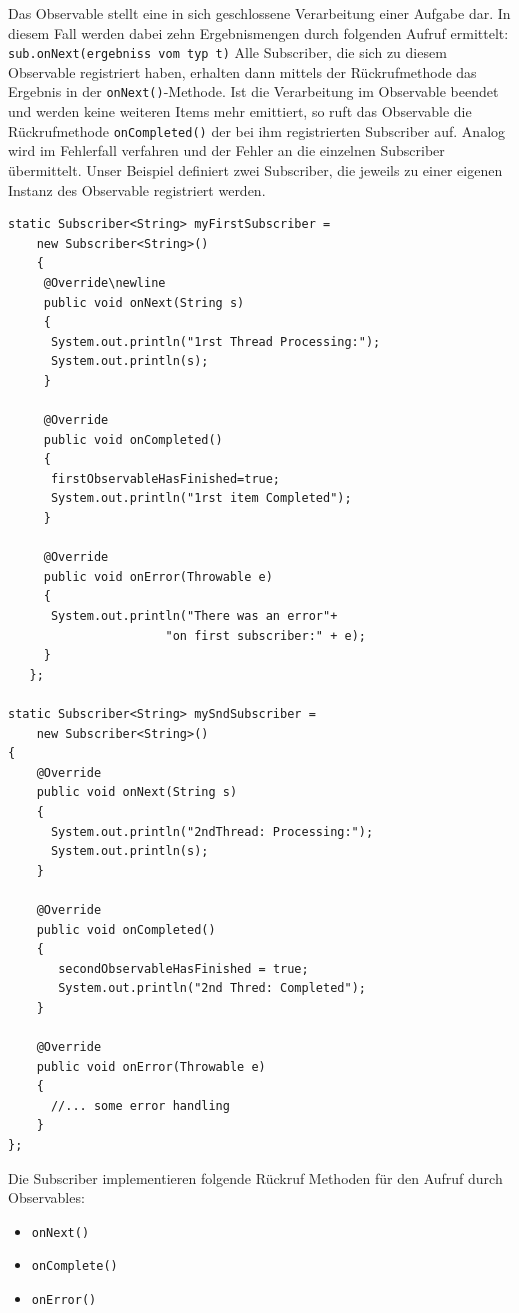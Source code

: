 \documentclass[12pt,oneside,a4paper,bibtotoc,liststotoc]{scrreprt}
\begin{document}
Das Observable stellt eine in sich geschlossene Verarbeitung einer Aufgabe dar. In diesem Fall werden dabei zehn Ergebnismengen durch folgenden Aufruf ermittelt:\newline\newline
\texttt{sub.onNext(ergebniss vom typ t)}\newline
\newline
Alle Subscriber, die sich zu diesem Observable registriert haben, erhalten dann mittels der Rückrufmethode das Ergebnis in der \texttt{onNext()}-Methode. Ist die Verarbeitung im Observable beendet und werden keine weiteren Items mehr emittiert, so ruft das Observable die Rückrufmethode \texttt{onCompleted()} der bei ihm registrierten Subscriber auf. Analog wird im Fehlerfall verfahren und der Fehler an die einzelnen Subscriber übermittelt. Unser Beispiel definiert zwei Subscriber, die jeweils zu einer eigenen Instanz des Observable registriert werden.\newline
\begin{lstlisting}
static Subscriber<String> myFirstSubscriber = 
    new Subscriber<String>() 
    {
     @Override\newline
     public void onNext(String s) 
     {
      System.out.println("1rst Thread Processing:");
      System.out.println(s);
     }

     @Override
     public void onCompleted() 
     {
      firstObservableHasFinished=true;
      System.out.println("1rst item Completed");
     }

     @Override
     public void onError(Throwable e) 
     {
      System.out.println("There was an error"+
                      "on first subscriber:" + e);
     }
   };

static Subscriber<String> mySndSubscriber = 
	new Subscriber<String>() 
{
    @Override
    public void onNext(String s) 
    {
      System.out.println("2ndThread: Processing:");
      System.out.println(s);
    }

    @Override
    public void onCompleted() 
    {
       secondObservableHasFinished = true;
       System.out.println("2nd Thred: Completed");
    }

    @Override
    public void onError(Throwable e) 
    {
      //... some error handling
    }
};
\end{lstlisting}
Die Subscriber implementieren folgende Rückruf Methoden für den Aufruf durch Observables:
\begin{itemize}
\item \texttt{onNext()}
\item \texttt{onComplete()}
\item \texttt{onError()}
\end{itemize}
\end{document}
